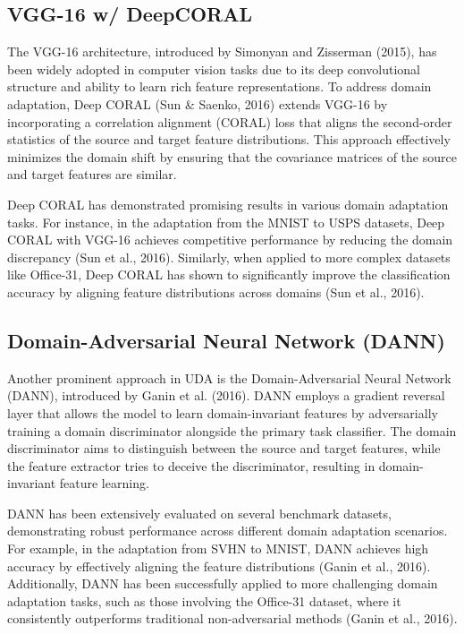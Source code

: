 \documentclass[conference]{IEEEtran}
\begin{document}
\subsection{VGG-16 w/ DeepCORAL}

The VGG-16 architecture, introduced by Simonyan and Zisserman (2015), has been widely adopted in computer vision tasks due to its deep convolutional structure and ability to learn rich feature representations. To address domain adaptation, Deep CORAL (Sun & Saenko, 2016) extends VGG-16 by incorporating a correlation alignment (CORAL) loss that aligns the second-order statistics of the source and target feature distributions. This approach effectively minimizes the domain shift by ensuring that the covariance matrices of the source and target features are similar.

Deep CORAL has demonstrated promising results in various domain adaptation tasks. For instance, in the adaptation from the MNIST to USPS datasets, Deep CORAL with VGG-16 achieves competitive performance by reducing the domain discrepancy (Sun et al., 2016). Similarly, when applied to more complex datasets like Office-31, Deep CORAL has shown to significantly improve the classification accuracy by aligning feature distributions across domains (Sun et al., 2016).

\subsection{Domain-Adversarial Neural Network (DANN)}
Another prominent approach in UDA is the Domain-Adversarial Neural Network (DANN), introduced by Ganin et al. (2016). DANN employs a gradient reversal layer that allows the model to learn domain-invariant features by adversarially training a domain discriminator alongside the primary task classifier. The domain discriminator aims to distinguish between the source and target features, while the feature extractor tries to deceive the discriminator, resulting in domain-invariant feature learning.

DANN has been extensively evaluated on several benchmark datasets, demonstrating robust performance across different domain adaptation scenarios. For example, in the adaptation from SVHN to MNIST, DANN achieves high accuracy by effectively aligning the feature distributions (Ganin et al., 2016). Additionally, DANN has been successfully applied to more challenging domain adaptation tasks, such as those involving the Office-31 dataset, where it consistently outperforms traditional non-adversarial methods (Ganin et al., 2016).
\end{document}
